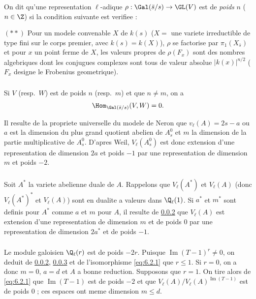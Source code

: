 \subsubsection{}
\label{subsubsec:6.3}
On dit qu'une representation $\ell$-adique $\rho: \Gal(\bar{s}/s) \to \GL(V)$ est de \emph{poids} $n$ ($n \in \Z$) si la condition suivante est verifiee :

$(**)$ Pour un modele convenable $X$ de $k(s)$ ($X =$ une variete irreductible de type fini sur le corps premier, avec $k(s) = k(X)$), $\rho$ se factorise par $\pi_1(X_{\bar{s}})$ et pour $x$ un point ferme de $X$, les valeurs propres de $\rho(F_x)$ sont des nombres algebriques dont les conjugues complexes sont tous de valeur absolue $|k(x)|^{n/2}$ ($F_x$ designe le Frobenius geometrique).

\subsubsection{}
\label{subsubsec:6.4}
Si $V$ (resp.~$W$) est de poids $n$ (resp.~$m$) et que $n \neq m$, on a
\[
\Hom_{\Gal(\bar{s}/s)}(V, W) = 0 .
\]

Il resulte de la propriete universelle du modele de Neron que $v_\ell(A) = 2s - a$ ou $a$ est la dimension du plus grand quotient abelien de $A_s^0$ et $m$ la dimension de la partie multiplicative de $A_s^0$. D'apres Weil, $V_\ell(A_s^0)$ est donc extension d'une representation de dimension $2a$ et poids $-1$ par une representation de dimension $m$ et poids $-2$.

\subsubsection{}
\label{subsubsec:6.5}
Soit $A^*$ la variete abelienne duale de $A$. Rappelons que $V_\ell(A^*)$ et $V_\ell(A)$ (donc $V_\ell(A^*)^*$ et $V_\ell(A)$) sont en dualite a valeurs dans $\Q_\ell(1)$. Si $a^*$ et $m^*$ sont definis pour $A^*$ comme $a$ et $m$ pour $A$, il resulte de \ref{subsubsec:6.4} que $V_\ell(A)$ est extension d'une representation de dimension $m$ et de poids $0$ par une representation de dimension $2a^*$ et de poids $-1$.

\subsubsection{}
\label{subsubsec:6.6}
Le module galoisien $\Q_\ell(r)$ est de poids $-2r$. Puisque $\operatorname{Im}(T-1)^r \neq 0$, on deduit de \ref{subsubsec:6.4}, \ref{subsubsec:6.5} et de l'isomorphisme \ref{eq:6.2.1} que $r \leqslant 1$. Si $r = 0$, on a donc $m = 0$, $a = d$ et $A$ a bonne reduction. Supposons que $r = 1$. On tire alors de \ref{eq:6.2.1} que $\operatorname{Im}(T-1)$ est de poids $-2$ et que $V_\ell(A)/V_\ell(A)^{\operatorname{Im}(T-1)}$ est de poids $0$ ; ces espaces ont meme dimension $m \leqslant d$.

